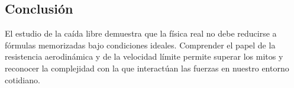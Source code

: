 \documentclass[11pt,a4paper]{article}
\begin{document}
	\subsection*{Conclusión}
	El estudio de la caída libre demuestra que la física real no debe reducirse a fórmulas memorizadas bajo condiciones ideales. Comprender el papel de la resistencia aerodinámica y de la velocidad límite permite superar los mitos y reconocer la complejidad con la que interactúan las fuerzas en nuestro entorno cotidiano.
	
\end{document}
